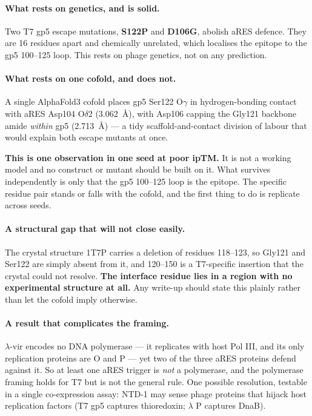 \documentclass[11pt,a4paper]{article}
\begin{document}
\paragraph{What rests on genetics, and is solid.} Two T7 gp5 escape mutations,
\textbf{S122P} and \textbf{D106G}, abolish aRES defence. They are 16 residues
apart and chemically unrelated, which localises the epitope to the gp5 100--125
loop. This rests on phage genetics, not on any prediction.

\paragraph{What rests on one cofold, and does not.}

\begin{caveat}
A single AlphaFold3 cofold places gp5 Ser122 O$\gamma$ in hydrogen-bonding
contact with aRES Asp104 O$\delta$2 (\SI{3.062}{\angstrom}), with Asp106 capping
the Gly121 backbone amide \emph{within} gp5 (\SI{2.713}{\angstrom}) --- a tidy
scaffold-and-contact division of labour that would explain both escape mutants
at once.

\textbf{This is one observation in one seed at poor ipTM.} It is not a working
model and no construct or mutant should be built on it. What survives
independently is only that the gp5 100--125 loop is the epitope. The specific
residue pair stands or falls with the cofold, and the first thing to do is
replicate across seeds.
\end{caveat}

\paragraph{A structural gap that will not close easily.} The crystal structure
1T7P carries a deletion of residues 118--123, so Gly121 and Ser122 are simply
absent from it, and 120--150 is a T7-specific insertion that the crystal could
not resolve. \textbf{The interface residue lies in a region with no experimental
structure at all.} Any write-up should state this plainly rather than let the
cofold imply otherwise.

\paragraph{A result that complicates the framing.} $\lambda$-vir encodes no DNA
polymerase --- it replicates with host Pol III, and its only replication proteins
are O and P --- yet two of the three aRES proteins defend against it. So at least
one aRES trigger is \emph{not} a polymerase, and the polymerase framing holds for
T7 but is not the general rule. One possible resolution, testable in a single
co-expression assay: NTD-1 may sense phage proteins that hijack host replication
factors (T7 gp5 captures thioredoxin; $\lambda$ P captures DnaB).
\end{document}
